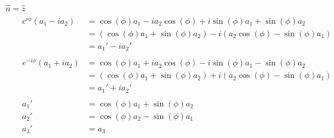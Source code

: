 \begin{answer}
\begin{answerpart}{\texorpdfstring{$\hat{n} = \hat{z}$}{n = z}}
    \begin{equation}
      \begin{alignedat}{2}
        &&e^{i\phi}(a_1 - ia_2)
        &= \cos(\phi)a_1 - ia_2\cos(\phi) + i\sin(\phi)a_1 + \sin(\phi)a_2\\
        &&&=
        (\cos(\phi)a_1 + \sin(\phi)a_2)
        - i(a_2\cos(\phi) - \sin(\phi)a_1)\\
        &&&= a_1' - ia_2'\\
        \\
        &&e^{-i\phi}(a_1 + ia_2)
        &= \cos(\phi)a_1 + ia_2\cos(\phi) - i\sin(\phi)a_1 - \sin(\phi)a_2\\
        &&&=
        (\cos(\phi)a_1 + \sin(\phi)a_2)
        + i(a_2\cos(\phi) - \sin(\phi)a_1)\\
        &&&= a_1' + ia_2'\\
        \\
        &&a_1' &= \cos(\phi)a_1 + \sin(\phi)a_2\\
        &&a_2' &= \cos(\phi)a_2 - \sin(\phi)a_1\\
        &&a_3' &= a_3\\
      \end{alignedat}
    \end{equation}

  \end{answerpart}
\end{answer}
